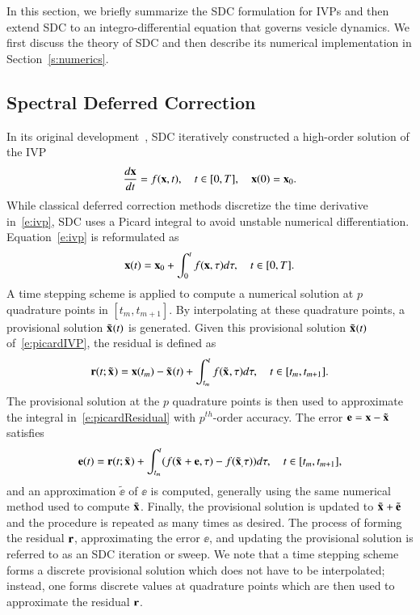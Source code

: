 In this section, we briefly summarize the SDC formulation for IVPs and
then extend SDC to an integro-differential equation that governs
vesicle dynamics.  We first discuss the theory of SDC and then describe
its numerical implementation in Section~\ref{s:numerics}.

\subsection{Spectral Deferred Correction}
In its original development~\cite{dut:gre:rok2000}, SDC iteratively
constructed a high-order solution of the IVP
\begin{align}
  \frac{d{\mathbf{x}}}{dt} = f({\mathbf{x}},t), \quad t \in [0,T],
  \quad {\mathbf{x}}(0) = {\mathbf{x}}_{0}. 
\label{e:ivp}
\end{align}
While classical deferred correction methods discretize the time
derivative in~\eqref{e:ivp}, SDC uses a Picard integral to avoid
unstable numerical differentiation.  Equation~\eqref{e:ivp} is
reformulated as
\begin{align}
  {\mathbf{x}}(t) = {\mathbf{x}}_{0} + \int_{0}^{t} f({\mathbf{x}},\tau) d\tau, \quad t \in [0,T].
\label{e:picardIVP}
\end{align}
A time stepping scheme is applied to compute a numerical solution at $p$
quadrature points in $[t_{m},t_{m+1}]$.  By interpolating at these
quadrature points, a provisional solution ${\tilde{{\mathbf{x}}}_{}}(t)$ is generated.
Given this provisional solution ${\tilde{{\mathbf{x}}}_{}}(t)$ of~\eqref{e:picardIVP}, the
residual is defined as
\begin{align}
  {\mathbf{r}}(t;{\tilde{{\mathbf{x}}}_{}}) = {\mathbf{x}}(t_{m}) - {\tilde{{\mathbf{x}}}_{}}(t) + 
    \int_{t_{m}}^{t} f({\tilde{{\mathbf{x}}}_{}},\tau) d\tau, 
    \quad t \in [t_{m},t_{m+1}].
  \label{e:picardResidual}
\end{align}
The provisional solution at the $p$ quadrature points is then used to
approximate the integral in~\eqref{e:picardResidual} with
$p^{th}$-order accuracy.  The error ${\mathbf{e}} = {\mathbf{x}} - {\tilde{{\mathbf{x}}}_{}}$ satisfies
\begin{align}
  {\mathbf{e}}(t) = {\mathbf{r}}(t;{\tilde{{\mathbf{x}}}_{}}) + \int_{t_{m}}^{t} 
      (f({\tilde{{\mathbf{x}}}_{}} + {\mathbf{e}},\tau) - f({\tilde{{\mathbf{x}}}_{,}}\tau)) d\tau, \quad
      t \in [t_{m},t_{m+1}],
  \label{e:picardCorrect}
\end{align}
and an approximation $\tilde{\ee}$ of $\ee$ is computed, generally
using the same numerical method used to compute ${\tilde{{\mathbf{x}}}_{}}$.  Finally, the
provisional solution is updated to ${\tilde{{\mathbf{x}}}_{}} + \tilde{{\mathbf{e}}}$ and the
procedure is repeated as many times as desired.  The process of forming
the residual ${\mathbf{r}}$, approximating the error $\ee$, and updating the
provisional solution is referred to as an SDC iteration or sweep.  We
note that a time stepping scheme forms a discrete provisional solution
which does not have to be interpolated; instead, one forms discrete
values at quadrature points which are then used to approximate the
residual ${\mathbf{r}}$.


